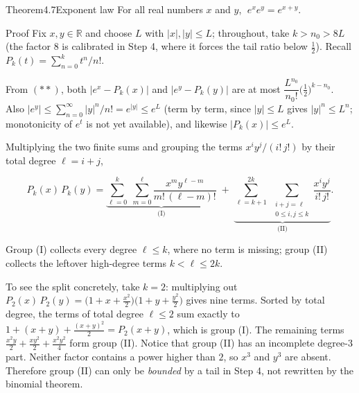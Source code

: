 \documentclass[a4paper,12pt,oneside]{memoir}
\begin{document}
\begin{envtheorem}{Theorem}{4.7}{Exponent law}
For all real numbers \(x\) and \(y\), \(\; e^{x} e^{y} = e^{x + y}\).
\end{envtheorem}
\begin{envproof}{Proof}{}{}
Fix \(x, y \in \mathbb{R}\) and choose \(L\) with \(\lvert x \rvert, \lvert y \rvert \le L\); throughout, take \(k > n_{0} > 8L\) (the factor \(8\) is calibrated in Step 4, where it forces the tail ratio below \(\tfrac{1}{2}\)). Recall \(P_{k}(t) = \sum_{n=0}^{k} t^{n}/n!\).

From \((**)\), both \(\lvert e^{x} - P_{k}(x) \rvert\) and \(\lvert e^{y} - P_{k}(y) \rvert\) are at most \(\dfrac{L^{n_{0}}}{n_{0}!}\bigl(\tfrac{1}{2}\bigr)^{k - n_{0}}\). Also \(\lvert e^{y} \rvert \le \sum_{n=0}^{\infty} \lvert y \rvert^{n}/n! = e^{\lvert y \rvert} \le e^{L}\) (term by term, since \(\lvert y \rvert \le L\) gives \(\lvert y \rvert^{n} \le L^{n}\); monotonicity of \(e^{t}\) is not yet available), and likewise \(\lvert P_{k}(x) \rvert \le e^{L}\).

Multiplying the two finite sums and grouping the terms \(x^{i} y^{j}/(i!\,j!)\) by their total degree \(\ell = i + j\),

\[ P_{k}(x)\, P_{k}(y) = \underbrace{\sum_{\ell = 0}^{k} \; \sum_{m = 0}^{\ell} \frac{x^{m} y^{\ell - m}}{m!\,(\ell - m)!}}_{\text{(I)}} \; + \; \underbrace{\sum_{\ell = k + 1}^{2k} \; \sum_{\substack{i + j = \ell \\ 0 \le i, j \le k}} \frac{x^{i} y^{j}}{i!\, j!}}_{\text{(II)}}. \]

Group (I) collects every degree \(\ell \le k\), where no term is missing; group (II) collects the leftover high-degree terms \(k < \ell \le 2k\).

To see the split concretely, take \(k = 2\): multiplying out \(P_{2}(x)\,P_{2}(y) = \bigl(1 + x + \tfrac{x^{2}}{2}\bigr)\bigl(1 + y + \tfrac{y^{2}}{2}\bigr)\) gives nine terms. Sorted by total degree, the terms of total degree \(\ell \le 2\) sum exactly to \(1 + (x + y) + \tfrac{(x + y)^{2}}{2} = P_{2}(x + y)\), which is group (I). The remaining terms \(\tfrac{x^{2} y}{2} + \tfrac{x y^{2}}{2} + \tfrac{x^{2} y^{2}}{4}\) form group (II). Notice that group (II) has an incomplete degree-\(3\) part. Neither factor contains a power higher than \(2\), so \(x^{3}\) and \(y^{3}\) are absent. Therefore group (II) can only be \emph{bounded} by a tail in Step 4, not rewritten by the binomial theorem.


\end{envproof}
\end{document}
